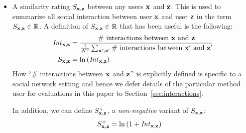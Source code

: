 \begin{itemize}
\item A similarity rating $S_{\mathbf{x},\mathbf{z}}$ between any users $\mathbf{x}$ and $\mathbf{z}$. This is used to summarize all social
interaction between user $\mathbf{x}$ and user $\mathbf{z}$ in the term $S_{\mathbf{x},\mathbf{z}} \in
\mathbb{R}$.  A definition of $S_{\mathbf{x},\mathbf{z}} \in \mathbb{R}$ that has been useful is the
following:
\begin{align}
\mathit{Int}_{\mathbf{x},\mathbf{z}} & = \frac{\mbox{\# interactions between $\mathbf{x}$
and $\mathbf{z}$}}{\frac{1}{N^2} \sum_{\mathbf{x}',\mathbf{z}'} \mbox{\# interactions between $\mathbf{x}'$
and $\mathbf{z}'$}} \nonumber \\
S_{\mathbf{x},\mathbf{z}} & = \ln \left( \mathit{Int}_{\mathbf{x},\mathbf{z}} \right)
\end{align}
How ``\# interactions between $\mathbf{x}$ and $\mathbf{z}$'' is explicitly defined is
specific to a social network setting and hence we defer details of the
particular method user for evaluations in this paper to
Section~\ref{sec:interactions}.

In addition, we can define $S^+_{\mathbf{x},\mathbf{z}}$, a \emph{non-negative} 
variant of $S_{\mathbf{x},\mathbf{z}}$:
\begin{align}
S^+_{\mathbf{x},\mathbf{z}} & = \ln \left( 1 + \mathit{Int}_{\mathbf{x},\mathbf{z}} \right)
\end{align}
\end{itemize}

%

